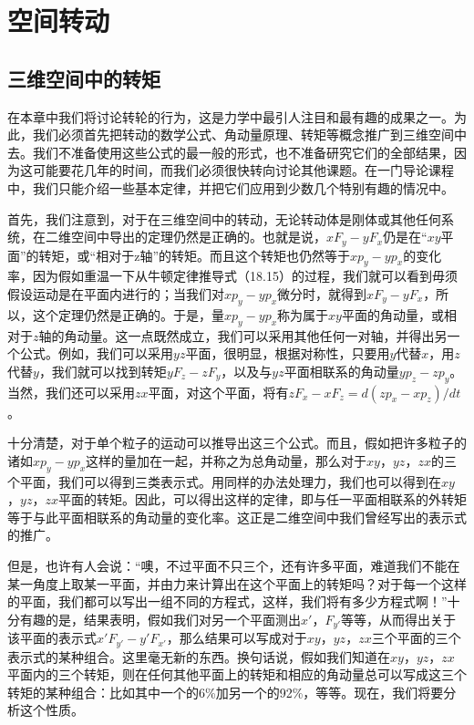 \chapter{空间转动}

\section{三维空间中的转矩}

在本章中我们将讨论转轮的行为，这是力学中最引人注目和最有趣的成果之一。为此，我们必须首先把转动的数学公式、角动量原理、转矩等概念推广到三维空间中去。我们不准备使用这些公式的最一般的形式，也不准备研究它们的全部结果，因为这可能要花几年的时间，而我们必须很快转向讨论其他课题。在一门导论课程中，我们只能介绍一些基本定律，并把它们应用到少数几个特别有趣的情况中。

首先，我们注意到，对于在三维空间中的转动，无论转动体是刚体或其他任何系统，在二维空间中导出的定理仍然是正确的。也就是说，$xF_y-yF_x$仍是在“$xy$平面”的转矩，或“相对于z轴”的转矩。而且这个转矩也仍然等于$xp_y-yp_x$的变化率，因为假如重温一下从牛顿定律推导式（18.15）的过程，我们就可以看到毋须假设运动是在平面内进行的；当我们对$xp_y-yp_x$微分时，就得到$xF_y-yF_x$，所以，这个定理仍然是正确的。于是，量$xp_y-yp_x$称为属于$xy$平面的角动量，或相对于$z$轴的角动量。这一点既然成立，我们可以采用其他任何一对轴，并得出另一个公式。例如，我们可以采用$yz$平面，很明显，根据对称性，只要用$y$代替$x$，用$z$代替$y$，我们就可以找到转矩$yF_z-zF_y$，以及与$yz$平面相联系的角动量$yp_z-zp_y$。当然，我们还可以采用$zx$平面，对这个平面，将有$zF_x-xF_z=d(zp_x-xp_z)/dt$。

十分清楚，对于单个粒子的运动可以推导出这三个公式。而且，假如把许多粒子的诸如$xp_y-yp_x$这样的量加在一起，并称之为总角动量，那么对于$xy$，$yz$，$zx$的三个平面，我们可以得到三类表示式。用同样的办法处理力，我们也可以得到在$xy$，$yz$，$zx$平面的转矩。因此，可以得出这样的定律，即与任一平面相联系的外转矩等于与此平面相联系的角动量的变化率。这正是二维空间中我们曾经写出的表示式的推广。

但是，也许有人会说：“噢，不过平面不只三个，还有许多平面，难道我们不能在某一角度上取某一平面，并由力来计算出在这个平面上的转矩吗？对于每一个这样的平面，我们都可以写出一组不同的方程式，这样，我们将有多少方程式啊！”十分有趣的是，结果表明，假如我们对另一个平面测出$x'$，$F_{y'}$等等，从而得出关于该平面的表示式$x'F_{y'}-y'F_{x'}$，那么结果可以写成对于$xy$，$yz$，$zx$三个平面的三个表示式的某种组合。这里毫无新的东西。换句话说，假如我们知道在$xy$，$yz$，$zx$平面内的三个转矩，则在任何其他平面上的转矩和相应的角动量总可以写成这三个转矩的某种组合：比如其中一个的6\%加另一个的92\%，等等。现在，我们将要分析这个性质。

